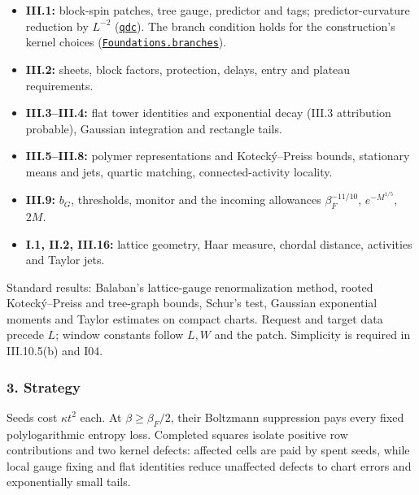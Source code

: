 \documentclass[
  letterpaper,
  11pt]{article}
\providecommand{\tightlist}{%
  \setlength{\itemsep}{0pt}\setlength{\parskip}{0pt}}
\begin{document}
\begin{itemize}
\tightlist
\item
  \textbf{III.1:} block-spin patches, tree gauge, predictor and tags;
  predictor-curvature reduction by \(L^{-2}\)
  (\href{https://github.com/yang-mills-group/OpenAI-YM-20261028/blob/3456e5e75cf8d4cd558955a5c7638fba2d68f464/YM/Pressure/Cost.lean\#L210-L252}{\texttt{qdc}}).
  The branch condition holds for the construction's kernel choices
  (\href{https://github.com/yang-mills-group/OpenAI-YM-20261028/blob/3456e5e75cf8d4cd558955a5c7638fba2d68f464/YM/Next/FOUNDATIONS/Primary.lean\#L70-L71}{\texttt{Foundations.branches}}).
\item
  \textbf{III.2:} sheets, block factors, protection, delays, entry and
  plateau requirements.
\item
  \textbf{III.3--III.4:} flat tower identities and exponential decay
  (III.3 attribution probable), Gaussian integration and rectangle
  tails.
\item
  \textbf{III.5--III.8:} polymer representations and Kotecký--Preiss
  bounds, stationary means and jets, quartic matching,
  connected-activity locality.
\item
  \textbf{III.9:} \(b_G\), thresholds, monitor and the incoming
  allowances \(\beta_F^{-11/10}\), \(e^{-M^{1/5}}\), \(2M\).
\item
  \textbf{I.1, II.2, III.16:} lattice geometry, Haar measure, chordal
  distance, activities and Taylor jets.
\end{itemize}

Standard results: Balaban's lattice-gauge renormalization method, rooted
Kotecký--Preiss and tree-graph bounds, Schur's test, Gaussian
exponential moments and Taylor estimates on compact charts. Request and
target data precede \(L\); window constants follow \(L,W\) and the
patch. Simplicity is required in III.10.5(b) and I04.

\subsubsection{3. Strategy}\label{strategy-12}

Seeds cost \(\kappa t^2\) each. At \(\beta\ge\beta_F/2\), their
Boltzmann suppression pays every fixed polylogarithmic entropy loss.
Completed squares isolate positive row contributions and two kernel
defects: affected cells are paid by spent seeds, while local gauge
fixing and flat identities reduce unaffected defects to chart errors and
exponentially small tails.
\end{document}
